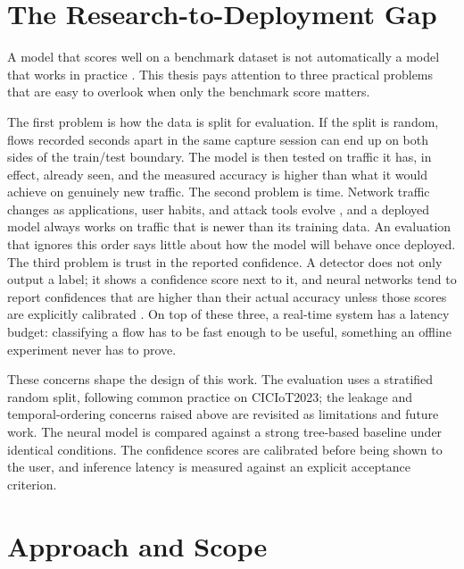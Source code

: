 \section{The Research-to-Deployment Gap}
\label{sec:intro_gap}

\par A model that scores well on a benchmark dataset is not automatically a model that works in practice \cite{Apruzzese2023}. This thesis pays attention to three practical problems that are easy to overlook when only the benchmark score matters.

\par The first problem is how the data is split for evaluation. If the split is random, flows recorded seconds apart in the same capture session can end up on both sides of the train/test boundary. The model is then tested on traffic it has, in effect, already seen, and the measured accuracy is higher than what it would achieve on genuinely new traffic. The second problem is time. Network traffic changes as applications, user habits, and attack tools evolve \cite{Andresini2021}, and a deployed model always works on traffic that is newer than its training data. An evaluation that ignores this order says little about how the model will behave once deployed. The third problem is trust in the reported confidence. A detector does not only output a label; it shows a confidence score next to it, and neural networks tend to report confidences that are higher than their actual accuracy unless those scores are explicitly calibrated \cite{Guo2017}. On top of these three, a real-time system has a latency budget: classifying a flow has to be fast enough to be useful, something an offline experiment never has to prove.

\par These concerns shape the design of this work. The evaluation uses a stratified random split, following common practice on CICIoT2023; the leakage and temporal-ordering concerns raised above are revisited as limitations and future work. The neural model is compared against a strong tree-based baseline under identical conditions. The confidence scores are calibrated before being shown to the user, and inference latency is measured against an explicit acceptance criterion.

\section{Approach and Scope}
\label{sec:intro_approach}

